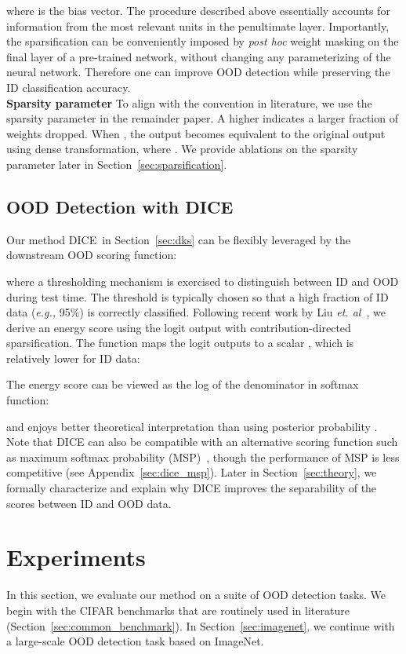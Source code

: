 \documentclass[runningheads]{llncs}
\newcommand{\methodAbbr}{DICE~}
\begin{document}
where  is the bias vector. The procedure described above essentially accounts for information from the most relevant units in the penultimate layer. Importantly, the sparsification can be conveniently imposed by \emph{post hoc} weight masking on the final layer of a pre-trained network, without changing any parameterizing of the neural network. Therefore one can improve OOD detection while preserving the ID classification accuracy. \\

\noindent \textbf{Sparsity parameter } To align with the convention in literature, we use the sparsity parameter  in the remainder paper. A higher  indicates a larger fraction of weights dropped. When , the output becomes equivalent to the original output  using dense transformation, where . We provide ablations on the sparsity parameter later in Section~\ref{sec:sparsification}.
\subsection{OOD Detection with DICE}
Our method \methodAbbr  in Section~\ref{sec:dks} can be flexibly leveraged by the downstream OOD scoring function:

 where a thresholding mechanism is exercised to distinguish between ID and OOD during test time. The threshold  is typically chosen so that a high fraction of ID data (\emph{e.g.,} 95\%) is correctly classified. Following recent work by Liu \emph{et. al}~\cite{liu2020energy}, we derive an energy score using the logit output  with contribution-directed sparsification. The function maps the logit outputs  to a scalar , which is relatively lower for ID data:
 
 The energy score can be viewed as the log of the denominator in softmax function:
 
and enjoys better theoretical interpretation than using posterior probability . 
Note that DICE can also be compatible with an alternative scoring function such as maximum softmax probability (MSP)~\cite{Kevin}, though the performance of MSP is less competitive (see Appendix~\ref{sec:dice_msp}). Later in Section~\ref{sec:theory}, we formally characterize and explain why DICE improves the separability of the  scores between ID and OOD data. 
\label{sec:ood}




\section{Experiments}
\label{sec:experiments}
In this section, we evaluate our method on a suite of OOD detection tasks. We begin with the CIFAR benchmarks that are routinely used in literature (Section~\ref{sec:common_benchmark}).  In Section~\ref{sec:imagenet}, we continue with a large-scale OOD detection task based on ImageNet. 
\end{document}
